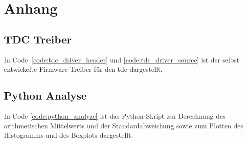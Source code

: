 \documentclass[11pt,a4paper,hidelinks]{article}
\begin{document}
\pagebreak

\section{Anhang}

\subsection{TDC Treiber}\label{sec:tdc_driver}

In Code~\ref{code:tdc_driver_header} und \ref{code:tdc_driver_source} ist der selbst entwickelte Firmware-Treiber für
den \acrshort{tdc} dargestellt.




\subsection{Python Analyse}\label{sec:python_analyze}

In Code \ref{code:python_analyze} ist das Python-Skript zur Berechnung des arithmetischen Mittelwerts und der
Standardabweichung sowie zum Plotten des Histogramms und des Boxplots dargestellt.





\end{document}
